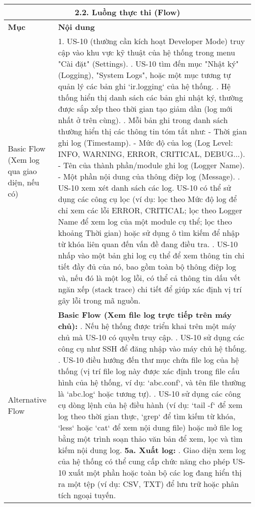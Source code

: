 \begin{longtable}{|m{4cm}|p{11cm}|}
\hline
\multicolumn{2}{|c|}{\textbf{2.2. Luồng thực thi (Flow)}} \\
\hline
\textbf{Mục} & \textbf{Nội dung} \\
\hline
Basic Flow (Xem log qua giao diện, nếu có) & 1. US-10 (thường cần kích hoạt Developer Mode) truy cập vào khu vực kỹ thuật của hệ thống trong menu "Cài đặt" (Settings). \newline 2. US-10 tìm đến mục "Nhật ký" (Logging), "System Logs", hoặc một mục tương tự quản lý các bản ghi `ir.logging` của hệ thống. \newline 3. Hệ thống hiển thị danh sách các bản ghi nhật ký, thường được sắp xếp theo thời gian tạo giảm dần (log mới nhất ở trên cùng). \newline 4. Mỗi bản ghi trong danh sách thường hiển thị các thông tin tóm tắt như: \newline    - Thời gian ghi log (Timestamp). \newline    - Mức độ của log (Log Level: INFO, WARNING, ERROR, CRITICAL, DEBUG...). \newline    - Tên của thành phần/module ghi log (Logger Name). \newline    - Một phần nội dung của thông điệp log (Message). \newline 5. US-10 xem xét danh sách các log. US-10 có thể sử dụng các công cụ lọc (ví dụ: lọc theo Mức độ log để chỉ xem các lỗi ERROR, CRITICAL; lọc theo Logger Name để xem log của một module cụ thể; lọc theo khoảng Thời gian) hoặc sử dụng ô tìm kiếm để nhập từ khóa liên quan đến vấn đề đang điều tra. \newline 6. US-10 nhấp vào một bản ghi log cụ thể để xem thông tin chi tiết đầy đủ của nó, bao gồm toàn bộ thông điệp log và, nếu đó là một log lỗi, có thể cả thông tin dấu vết ngăn xếp (stack trace) chi tiết để giúp xác định vị trí gây lỗi trong mã nguồn. \\
\hline
Alternative Flow & \textbf{Basic Flow (Xem file log trực tiếp trên máy chủ):} \newline    1. Nếu hệ thống được triển khai trên một máy chủ mà US-10 có quyền truy cập. \newline    2. US-10 sử dụng các công cụ như SSH để đăng nhập vào máy chủ hệ thống. \newline    3. US-10 điều hướng đến thư mục chứa file log của hệ thống (vị trí file log này được xác định trong file cấu hình của hệ thống, ví dụ: `abc.conf`, và tên file thường là `abc.log` hoặc tương tự). \newline    4. US-10 sử dụng các công cụ dòng lệnh của hệ điều hành (ví dụ: `tail -f` để xem log theo thời gian thực, `grep` để tìm kiếm từ khóa, `less` hoặc `cat` để xem nội dung file) hoặc mở file log bằng một trình soạn thảo văn bản để xem, lọc và tìm kiếm nội dung log. \newline \textbf{5a. Xuất log:} \newline    1. Giao diện xem log của hệ thống có thể cung cấp chức năng cho phép US-10 xuất một phần hoặc toàn bộ các log đang hiển thị ra một tệp (ví dụ: CSV, TXT) để lưu trữ hoặc phân tích ngoại tuyến. \\

\end{longtable}
